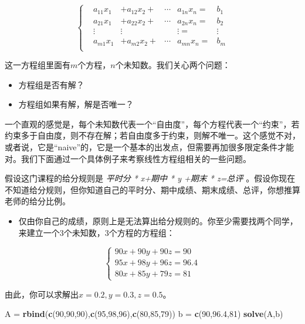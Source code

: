\documentclass[hyperref,]{ctexart}
\newenvironment{Shaded}{\begin{snugshade}}{\end{snugshade}}
\newcommand{\KeywordTok}[1]{\textcolor[rgb]{0.13,0.29,0.53}{\textbf{#1}}}
\newcommand{\DecValTok}[1]{\textcolor[rgb]{0.00,0.00,0.81}{#1}}
\newcommand{\FloatTok}[1]{\textcolor[rgb]{0.00,0.00,0.81}{#1}}
\newcommand{\StringTok}[1]{\textcolor[rgb]{0.31,0.60,0.02}{#1}}
\newcommand{\NormalTok}[1]{#1}
\providecommand{\tightlist}{%
  \setlength{\itemsep}{0pt}\setlength{\parskip}{0pt}}
\begin{document}
\begin{equation}
\left\{
\begin{aligned}
&a_{11}x_1&+a_{12}x_2+&\cdots &a_{1n}x_n = &b_1\\
&a_{21}x_1&+a_{22}x_2+&\cdots& a_{2n}x_n = &b_2\\
&\vdots&\vdots&&\vdots=&\vdots\\
&a_{m1}x_1&+a_{m2}x_2+&\cdots& a_{mn}x_n = &b_m\\
\end{aligned}\right.
\end{equation}

这一方程组里面有\(m\)个方程，\(n\)个未知数。我们关心两个问题：

\begin{itemize}
\tightlist
\item
  方程组是否有解？
\item
  方程组如果有解，解是否唯一？
\end{itemize}

一个直观的感觉是，每个未知数代表一个``自由度''，每个方程代表一个``约束''，若约束多于自由度，则不存在解；若自由度多于约束，则解不唯一。这个感觉不对，或者说，它是``naive''的，它是一个基本的出发点，但需要再加很多限定条件才能对。我们下面通过一个具体例子来考察线性方程组相关的一些问题。

假设这门课程的给分规则是 \emph{平时分 * x+期中 * y +期末 * z=总评}
。假设你现在不知道给分规则，但你知道自己的平时分、期中成绩、期末成绩、总评，你想推算老师的给分比例。

\begin{itemize}
\tightlist
\item
  仅由你自己的成绩，原则上是无法算出给分规则的。你至少需要找两个同学，来建立一个3个未知数，3个方程的方程组：
\end{itemize}

\begin{equation}
\left\{
\begin{aligned}
90x+90y+90z=90\\
95x+98y+96z=96.4\\
80x+85y+79z=81
\end{aligned}\right.
\end{equation}

由此，你可以求解出\(x=0.2,y=0.3,z=0.5\)。

\begin{Shaded}
\begin{Highlighting}[]
\NormalTok{A =}\StringTok{ }\KeywordTok{rbind}\NormalTok{(}\KeywordTok{c}\NormalTok{(}\DecValTok{90}\NormalTok{,}\DecValTok{90}\NormalTok{,}\DecValTok{90}\NormalTok{),}\KeywordTok{c}\NormalTok{(}\DecValTok{95}\NormalTok{,}\DecValTok{98}\NormalTok{,}\DecValTok{96}\NormalTok{),}\KeywordTok{c}\NormalTok{(}\DecValTok{80}\NormalTok{,}\DecValTok{85}\NormalTok{,}\DecValTok{79}\NormalTok{))}
\NormalTok{b =}\StringTok{ }\KeywordTok{c}\NormalTok{(}\DecValTok{90}\NormalTok{,}\FloatTok{96.4}\NormalTok{,}\DecValTok{81}\NormalTok{)}
\KeywordTok{solve}\NormalTok{(A,b)}
\end{Highlighting}
\end{Shaded}
\end{document}
